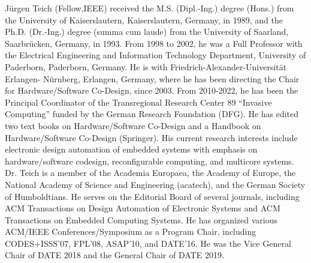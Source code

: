 \documentclass{ieeeaccess}
\begin{document}
\begin{IEEEbiography}{Jürgen Teich (Fellow,IEEE)}
received the M.S. (Dipl.-Ing.) degree (Hons.) from the University of Kaiserslautern,
Kaiserslautern, Germany, in 1989, and the Ph.D. (Dr.-Ing.) degree (summa cum laude) from the University of Saarland,
Saarbrücken, Germany, in 1993. From 1998 to 2002, he was a Full Professor with the Electrical Engineering and Information
Technology Department, University of Paderborn, Paderborn, Germany. He is with Friedrich-Alexander-Universität Erlangen-
Nürnberg, Erlangen, Germany, where he has been directing the Chair for Hardware/Software Co-Design, since 2003. From
2010-2022, he has been the Principal Coordinator of the Transregional Research Center 89 “Invasive Computing” funded by the
German Research Foundation (DFG). He has edited two text books on Hardware/Software Co-Design and a Handbook on
Hardware/Software Co-Design (Springer). His current research interests include electronic design automation of embedded
systems with emphasis on hardware/software codesign, reconfigurable computing, and multicore systems. Dr. Teich is a
member of the Academia Europaea, the Academy of Europe, the National Academy of Science and Engineering (acatech),
and the German Society of Humboldtians. He serves on the Editorial Board of several journals, including ACM Transactions on
Design Automation of Electronic Systems and ACM Transactions on Embedded Computing Systems. He has organized
various ACM/IEEE Conferences/Symposium as a Program Chair, including CODES+ISSS’07, FPL’08, ASAP’10, and
DATE’16. He was the Vice General Chair of DATE 2018 and the General Chair of DATE 2019.
\end{IEEEbiography}
\EOD
\clearpage
\end{document}
